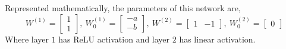 \documentclass[12pt,twoside]{article}
\begin{document}
\begin{problems}
\begin{problemparts}
Represented mathematically, the parameters of this network are,
$$ W^{(1)} = \begin{bmatrix} 
    1 \\
    1
\end{bmatrix},\ W_0^{(1)} = \begin{bmatrix}
    -a \\
    -b
\end{bmatrix},\ W^{(2)} = \begin{bmatrix}
    1 & -1
\end{bmatrix},\ W_0^{(2)} = \begin{bmatrix}
    0
\end{bmatrix} $$
Where layer $1$ has ReLU activation and layer $2$ has linear activation.

\end{problemparts}

\end{problems}
\end{document}
